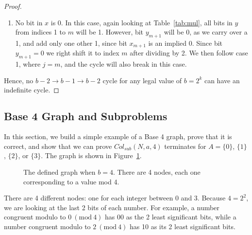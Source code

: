 \documentclass[12pt]{article}
\newcommand{\Mod}[1]{\ (\mathrm{mod}\ #1)}
\theoremstyle{definition}
\begin{document}
\begin{proof}
\begin{enumerate}
    \item No bit in $x$ is 0. In this case, again looking at Table~\ref{tab:mul}, all bits in $y$ from indices 1 to $m$ will be 1. However, bit $y_{m+1}$ will be 0, as we carry over a 1, and add only one other 1, since bit $x_{m+1}$ is an implied 0. Since bit $y_{m+1} = 0$ we right shift it to index $m$ after dividing by 2. We then follow case 1, where $j = m$, and the cycle will also break in this case.
 \end{enumerate}
 Hence, no $b-2 \rightarrow b-1 \rightarrow b-2$ cycle for any legal value of $b = 2^k$ can have an indefinite cycle. 
\end{proof}
\subsection{Base 4 Graph and Subproblems} \label{subsec:base4graph}
In this section, we build a simple example of a Base 4 graph, prove that it is correct, and show that we can prove $Col_{sub}(N,a,4)$ terminates
for $A = \{0\}$, $\{1\}$, $\{2\}$, or $\{3\}$. The graph is shown in Figure~\ref{fig:base_4_graph}. \par
\begin{figure}
    \centering
    \caption{The defined graph when $b = 4$. There are 4 nodes, each one corresponding to a value mod 4.}
    \label{fig:base_4_graph}
\end{figure}
There are 4 different nodes: one for each integer between 0 and 3. Because $4 = 2^2$, we are looking at the last 2 bits of each number. For example, a number congruent modulo to $0\Mod{4}$ has 00 as the 2 least significant bits, while a number congruent modulo to $2\Mod{4}$ has 10 as its 2 least significant bits. 
\end{document}
